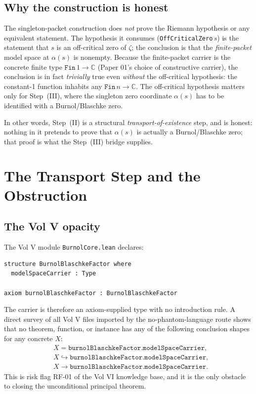 \documentclass[12pt]{article}
\theoremstyle{definition}
\theoremstyle{remark}
\newcommand{\C}{\mathbb{C}}
\newcommand{\inj}{\hookrightarrow}
\begin{document}
\subsection{Why the construction is honest}

The singleton-packet construction does \emph{not} prove the Riemann
hypothesis or any equivalent statement. The hypothesis it consumes
(\texttt{OffCriticalZero}\,$s$) is the statement that $s$ is an off-critical
zero of $\zeta$; the conclusion is that the \emph{finite-packet} model
space at $\alpha(s)$ is nonempty. Because the finite-packet carrier is the
concrete finite type $\texttt{Fin}\,1\to\C$ (Paper 01's choice of
constructive carrier), the conclusion is in fact \emph{trivially} true
even \emph{without} the off-critical hypothesis: the constant-1 function
inhabits any
$\texttt{Fin}\,n\to\C$. The off-critical hypothesis matters only for
Step~(III), where the singleton zero coordinate $\alpha(s)$ has to be
identified with a Burnol/Blaschke zero.

In other words, Step~(II) is a structural \emph{transport-of-existence}
step, and is honest: nothing in it pretends to prove that
$\alpha(s)$ is actually a Burnol/Blaschke zero; that proof is what the
Step~(III) bridge supplies.

\section{The Transport Step and the Obstruction}\label{sec:transport-obstruction}

\subsection{The Vol V opacity}

The Vol V module \texttt{BurnolCore.lean} declares:
\begin{verbatim}
structure BurnolBlaschkeFactor where
  modelSpaceCarrier : Type

axiom burnolBlaschkeFactor : BurnolBlaschkeFactor
\end{verbatim}
The carrier is therefore an axiom-supplied type with no introduction rule.
A direct survey of all Vol V files imported by the no-phantom-language
route shows that no theorem, function, or instance has any of the
following conclusion shapes for any concrete $X$:
\begin{align*}
& X = \texttt{burnolBlaschkeFactor.modelSpaceCarrier}, \\
& X \inj \texttt{burnolBlaschkeFactor.modelSpaceCarrier}, \\
& X \to \texttt{burnolBlaschkeFactor.modelSpaceCarrier}.
\end{align*}
This is risk flag RF-01 of the Vol VI knowledge base, and it is the only
obstacle to closing the unconditional principal theorem.
\end{document}
